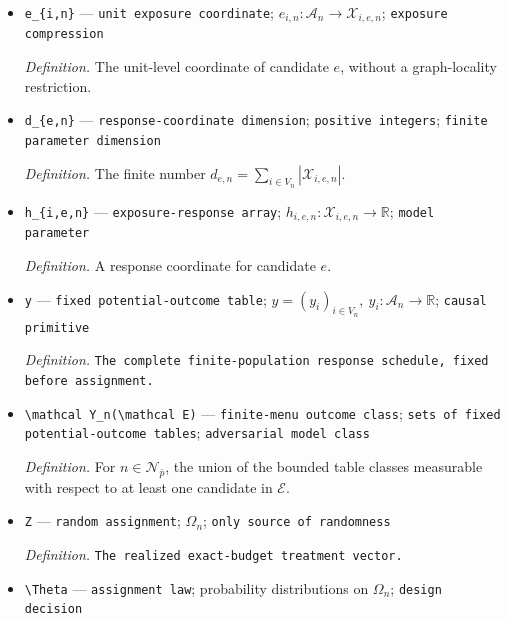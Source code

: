 \documentclass{article}
\begin{document}
\begin{itemize}
  \par\smallskip\noindent\emph{Definition.} The range of unit \(i\)'s exposure coordinate for candidate \(e\).
  \item \texttt{e\_\allowbreak{}\{i,\allowbreak{}n\}\allowbreak{}} --- \texttt{unit exposure coordinate}; \(e_{i,n}:\mathcal A_n\to\mathcal X_{i,e,n}\); \texttt{exposure compression}
  \par\smallskip\noindent\emph{Definition.} The unit-level coordinate of candidate \(e\), without a graph-locality restriction.
  \item \texttt{d\_\allowbreak{}\{e,\allowbreak{}n\}\allowbreak{}} --- \texttt{response-\allowbreak{}coordinate dimension}; \texttt{positive integers}; \texttt{finite parameter dimension}
  \par\smallskip\noindent\emph{Definition.} The finite number \(d_{e,n}=\sum_{i\in V_n}|\mathcal X_{i,e,n}|\).
  \item \texttt{h\_\allowbreak{}\{i,\allowbreak{}e,\allowbreak{}n\}\allowbreak{}} --- \texttt{exposure-\allowbreak{}response array}; \(h_{i,e,n}:\mathcal X_{i,e,n}\to\mathbb R\); \texttt{model parameter}
  \par\smallskip\noindent\emph{Definition.} A response coordinate for candidate \(e\).
  \item \texttt{y} --- \texttt{fixed potential-\allowbreak{}outcome table}; \(y=(y_i)_{i\in V_n},\ y_i:\mathcal A_n\to\mathbb R\); \texttt{causal primitive}
  \par\smallskip\noindent\emph{Definition.} \texttt{The complete finite-\allowbreak{}population response schedule,\allowbreak{} fixed before assignment.}
  \item \texttt{\textbackslash{}\allowbreak{}mathcal Y\_\allowbreak{}n(\textbackslash{}\allowbreak{}mathcal E)} --- \texttt{finite-\allowbreak{}menu outcome class}; \texttt{sets of fixed potential-\allowbreak{}outcome tables}; \texttt{adversarial model class}
  \par\smallskip\noindent\emph{Definition.} For \(n\in\mathcal N_{\bar p}\), the union of the bounded table classes measurable with respect to at least one candidate in \(\mathcal E\).
  \item \texttt{Z} --- \texttt{random assignment}; \(\Omega_n\); \texttt{only source of randomness}
  \par\smallskip\noindent\emph{Definition.} \texttt{The realized exact-\allowbreak{}budget treatment vector.}
  \item \texttt{\textbackslash{}\allowbreak{}Theta} --- \texttt{assignment law}; probability distributions on \(\Omega_n\); \texttt{design decision}

\end{itemize}
\end{document}

